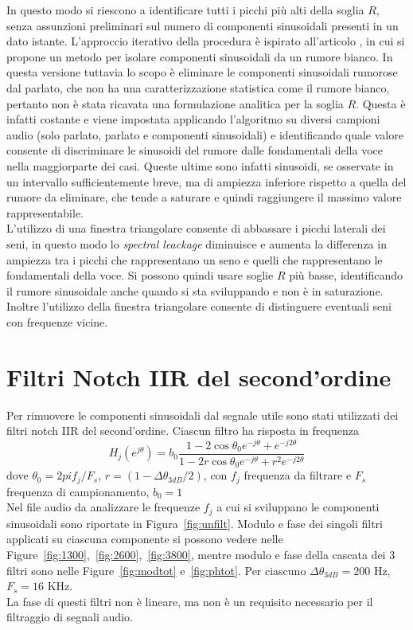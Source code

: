\documentclass[10pt,A4]{article}
\begin{document}
In questo modo si riescono a identificare tutti i picchi più alti della soglia $R$, senza assunzioni preliminari sul numero di componenti sinusoidali presenti in un dato istante. L'approccio iterativo della procedura è ispirato all'articolo \cite{iterative}, in cui si propone un metodo per isolare componenti sinusoidali da un rumore bianco. In questa versione tuttavia lo scopo è eliminare le componenti sinusoidali rumorose dal parlato, che non ha una caratterizzazione statistica come il rumore bianco, pertanto non è stata ricavata una formulazione analitica per la soglia $R$. Questa è infatti costante e viene impostata applicando l'algoritmo su diversi campioni audio (solo parlato, parlato e componenti sinusoidali) e identificando quale valore consente di discriminare le sinusoidi del rumore dalle fondamentali della voce nella maggiorparte dei casi. Queste ultime sono infatti sinusoidi, se osservate in un intervallo sufficientemente breve, ma di ampiezza inferiore rispetto a quella del rumore da eliminare, che tende a saturare e quindi raggiungere il massimo valore rappresentabile. \\
L'utilizzo di una finestra triangolare consente di abbassare i picchi laterali dei seni, in questo modo lo \textit{spectral leackage} diminuisce e aumenta la differenza in ampiezza tra i picchi che rappresentano un seno e quelli che rappresentano le fondamentali della voce. Si possono quindi usare soglie $R$ più basse, identificando il rumore sinusoidale anche quando si sta sviluppando e non è in saturazione. Inoltre l'utilizzo della finestra triangolare consente di distinguere eventuali seni con frequenze vicine. \\


\section{Filtri Notch IIR del second'ordine}
Per rimuovere le componenti sinusoidali dal segnale utile sono stati utilizzati dei filtri notch IIR del second'ordine.
Ciascun filtro ha risposta in frequenza
\begin{equation}
  H_j(e^{j\theta}) = b_0 \frac{1 - 2\cos\theta_0 e^{-j\theta} + e^{-j2\theta}}{1 - 2 r \cos\theta_0 e^{-j\theta} + r^2 e^{-j2\theta}}
\end{equation}
dove $\theta_0 = 2pif_j/F_s$, $r = (1 - \Delta\theta_{3dB} / 2)$, con $f_j$ frequenza da filtrare e $F_s$ frequenza di campionamento, $b_0 = 1$ \\
Nel file audio da analizzare le frequenze $f_j$ a cui si sviluppano le componenti sinusoidali sono riportate in Figura~\ref{fig:unfilt}. Modulo e fase dei singoli filtri applicati su ciascuna componente si possono vedere nelle Figure~\ref{fig:1300},~\ref{fig:2600},~\ref{fig:3800}, mentre modulo e fase della cascata dei 3 filtri sono nelle Figure~\ref{fig:modtot} e~\ref{fig:phtot}. Per ciascuno $ \Delta\theta_{3dB} = 200 $ Hz, $ F_s = 16 $ KHz. \\
La fase di questi filtri non è lineare, ma non è un requisito necessario per il filtraggio di segnali audio. \\
\end{document}
